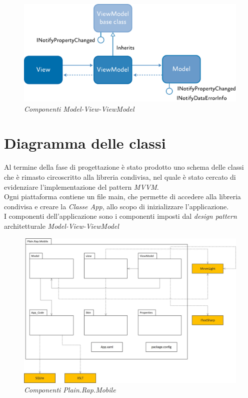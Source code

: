 		\begin{figure}[ht]
			\centering
			\includegraphics[scale=0.45]{immagini/progettazione/IC448599.png}
			\caption{\textit{Componenti Model-View-ViewModel}}
		\end{figure}\FloatBarrier

\section{Diagramma delle classi}
Al termine della fase di progettazione è stato prodotto uno schema delle classi che è rimasto circoscritto alla libreria condivisa, nel quale è stato cercato di evidenziare l'implementazione del pattern \textit{MVVM}.
\\
Ogni piattaforma contiene un file main, che permette di accedere alla libreria condivisa e creare la \textit{Classe App}, allo scopo di inizializzare l'applicazione.
\\
I componenti dell'applicazione \app sono i componenti imposti dal \textit{design pattern} architetturale \textit{Model-View-ViewModel}
		\begin{figure}[ht]
			\centering
			\includegraphics[scale=0.38]{immagini/progettazione/plainrap_portable.jpg}
			\caption{\textit{Componenti Plain.Rap.Mobile}}
		\end{figure}\FloatBarrier

